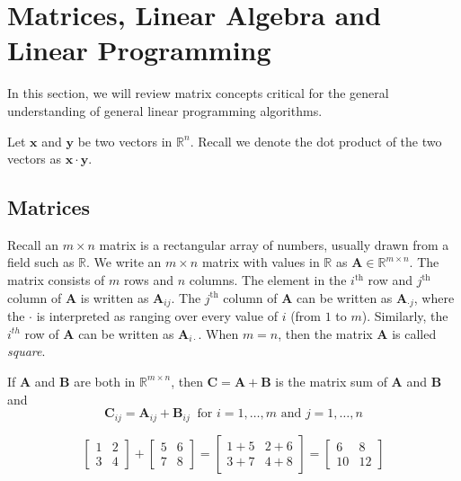 \chapter{Matrices, Linear Algebra and Linear Programming}\label{chap:Matrices}
In this section, we will review matrix concepts critical for the general understanding of general linear programming algorithms. 

Let $\mathbf{x}$ and $\mathbf{y}$ be two vectors in $\mathbb{R}^n$. Recall we denote the dot product of the two vectors as $\mathbf{x} \cdot \mathbf{y}$. 

\section{Matrices}
Recall an $m \times n$ matrix is a rectangular array of numbers, usually drawn from a field such as $\mathbb{R}$. We write an $m \times n$ matrix with values in $\mathbb{R}$ as $\mathbf{A} \in \mathbb{R}^{m \times n}$. The matrix consists of $m$ rows and $n$ columns. The element in the $i^\text{th}$ row and $j^\text{th}$ column of $\mathbf{A}$ is written as $\mathbf{A}_{ij}$. The $j^\text{th}$ column of $\mathbf{A}$ can be written as $\mathbf{A}_{\cdot j}$, where the $\cdot$ is interpreted as ranging over every value of $i$ (from $1$ to $m$). Similarly, the $i^{th}$ row of $\mathbf{A}$ can be written as $\mathbf{A}_{i\cdot}$. When $m = n$, then the matrix $\mathbf{A}$ is called \textit{square}.

\begin{definition}
If $\mathbf{A}$ and $\mathbf{B}$ are both in $\mathbb{R}^{m \times n}$, then $\mathbf{C} = \mathbf{A} + \mathbf{B}$ is the matrix sum of $\mathbf{A}$ and $\mathbf{B}$ and 
\begin{equation}
\mathbf{C}_{ij} = \mathbf{A}_{ij} + \mathbf{B}_{ij}\;\; \text{for $i=1,\dots,m$ and $j=1,\dots,n$}
\end{equation}
\end{definition}

\begin{example} 
\begin{equation}
\left[
\begin{array}{cc}
1 & 2\\
3 & 4
\end{array}
\right] + 
\left[
\begin{array}{cc}
5 & 6\\
7 & 8
\end{array}
\right] = 
\left[
\begin{array}{cc}
1 + 5 & 2 + 6\\
3 + 7 & 4 + 8
\end{array}
\right] = 
\left[
\begin{array}{cc}
6 & 8\\
10 & 12
\end{array}
\right]
\end{equation}
\end{example}

